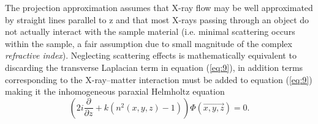 \documentclass[9pt, a4paper]{article}
\begin{document}
The projection approximation assumes that X-ray flow may be well approximated by straight lines parallel to z\cite{PagsTutes} and that most X-rays passing through an object do not actually interact with the sample material (i.e. minimal scattering occurs within the sample, a fair assumption due to small magnitude of the complex \textit{refractive index}). Neglecting scattering effects is mathematically equivalent to discarding the transverse Laplacian term in equation (\ref{eq:9})\cite{CH49}, in addition terms corresponding to the X-ray--matter interaction must be added to equation (\ref{eq:9}) making it the inhomogeneous paraxial Helmholtz equation
\begin{equation}\label{eq:13}
\left ( 2 i \frac{\partial }{\partial z} + k ( n^2 (x, y, z) - 1 )\right ) \Phi(\vec{x , y, z}) = 0.
\end{equation}




















\end{document}
